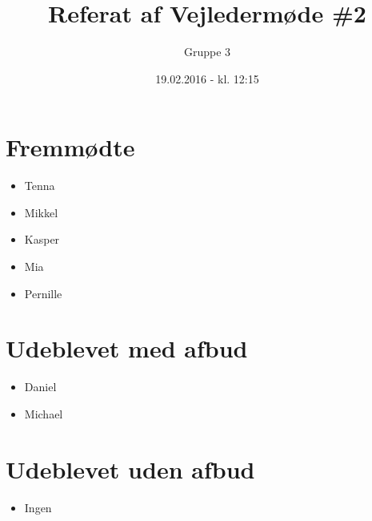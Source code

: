 \documentclass{article}
\title{Referat af Vejledermøde \#2}
\author{Gruppe 3}
\date{19.02.2016 - kl. 12:15}
\begin{document}
	\maketitle
	
	\section{Fremmødte}
	\begin{itemize}
		\item Tenna
		\item Mikkel 
		\item Kasper
		\item Mia 
		\item Pernille
	\end{itemize}
	
	\section{Udeblevet med afbud}
	\begin{itemize}
		\item Daniel
		\item Michael
	\end{itemize}
	
	\section{Udeblevet uden afbud}
	\begin{itemize}
		\item Ingen
	\end{itemize}
	
\end{document}
